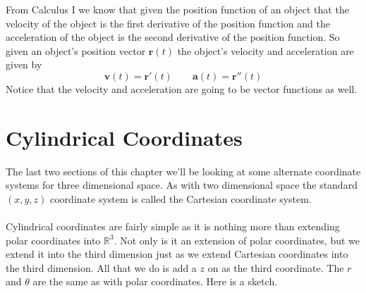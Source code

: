 \documentclass[10pt,reqno]{book}
\theoremstyle{definition}
\renewcommand{\vec}[1]{\mathbf{#1}}
\def\R{\mathbb{R}}
\begin{document}
	From Calculus I we know that given the position function of an object that the velocity of the object is the first derivative of the position function and the acceleration of the object is the second derivative of the position function. So given an object's position vector $ \vec{r}(t) $ the object's velocity and acceleration are given by 
	\[ \vec{v}(t) = \vec{r}'(t) \qquad \vec{a}(t) = \vec{r}''(t) \]
	Notice that the velocity and acceleration are going to be vector functions as well.
	
	\section{Cylindrical Coordinates}
	
	 The last two sections of this chapter we’ll be looking at some alternate coordinate systems for three dimensional space. As with two dimensional space the standard $ (x,y,z) $ coordinate system is called the Cartesian coordinate system.\\ \\
	 Cylindrical coordinates are fairly simple as it is nothing more than extending polar coordinates into $ \R^3 $. Not only is it an extension of polar coordinates, but we extend it into the third dimension just as we extend Cartesian coordinates into the third dimension.  All that we do is add a $ z $ on as the third coordinate. The $ r $ and $ \theta $ are the same as with polar coordinates. Here is a sketch.
	 
\end{document}
